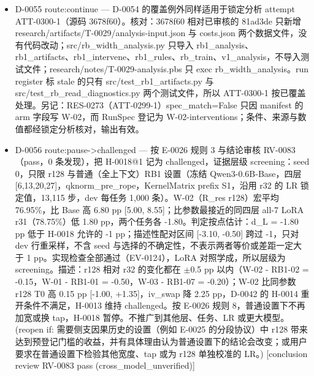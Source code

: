 \documentclass[11pt]{article}
\begin{document}
\begin{itemize}
\item D-0055 route:continue --- D-0054 的覆盖例外同样适用于锁定分析 attempt ATT-0300-1（源码 3678f60）。核对：3678f60 相对已审核的 81ad3de 只新增 research/artifacts/T-0029/analysis-input.json 与 costs.json 两个数据文件，没有代码改动；src/rb\_width\_analysis.py 只导入 rb1\_analysis、rb1\_artifacts、rb1\_intervene、rb1\_rules、rb\_train、v1\_analysis，不导入测试文件；research/notes/T-0029-analysis.pbs 只 exec rb\_width\_analysis。run register 标 stale 的只有 src/test\_rb1\_artifacts.py 与 src/test\_rb\_read\_diagnostics.py 两个测试文件，所以 ATT-0300-1 按已覆盖处理。另记：RES-0273（ATT-0299-1）spec\_match=False 只因 manifest 的 arm 字段写 W-02，而 RunSpec 登记为 W-02-interventions；条件、来源与数值都经锁定分析核对，输出有效。
\item D-0056 route:pause-\textgreater{}challenged --- 按 E-0026 规则 3 与结论审核 RV-0083（pass，0 条发现），把 H-0018@1 记为 challenged，证据层级 screening：seed 0，只限 r128 与普通（全上下文）RB1 设置（冻结 Qwen3-0.6B-Base，四层 [6,13,20,27]，qknorm\_pre\_rope，KernelMatrix prefix S1，沿用 r32 的 LR 锁定值，13,115 步，dev 每任务 1,000 条）。W-02（R\_res r128）宏平均 76.95\%，比 Base 高 6.80 pp [5.00, 8.55]；比参数最接近的同四层 all-7 LoRA r31（78.75\%）低 1.80 pp，两个任务各 -1.80。判定按点估计：d\_L = -1.80 pp 低于 H-0018 允许的 -1 pp；描述性配对区间 [-3.10, -0.50] 跨过 -1，只对 dev 行重采样，不含 seed 与选择的不确定性，不表示两者等价或差距一定大于 1 pp。实现检查全部通过（EV-0124），LoRA 对照学成，所以层级为 screening。描述：r128 相对 r32 的变化都在 \ensuremath{\pm}0.5 pp 以内（W-02 - RB1-02 = -0.15，W-01 - RB1-01 = -0.50，W-03 - RB1-07 = -0.20）；W-02 比同参数 r128 T0 高 0.15 pp [-1.00, +1.35]，iv\_swap 降 2.25 pp，D-0042 的 H-0014 重开条件不满足，H-0013 维持 challenged。按 E-0026 规则 8，普通设置下不再加宽或换 tap，H-0018 暂停。不推广到其他层、任务、LR 或更大模型。 (reopen if: 需要侧支因果历史的设置（例如 E-0025 的分段协议）中 r128 带来达到预登记门槛的收益，并有具体理由认为普通设置下的结论会改变；或用户要求在普通设置下检验其他宽度、tap 或为 r128 单独校准的 LR。) [conclusion review RV-0083 pass (cross\_model\_unverified)]

\end{itemize}
\end{document}
